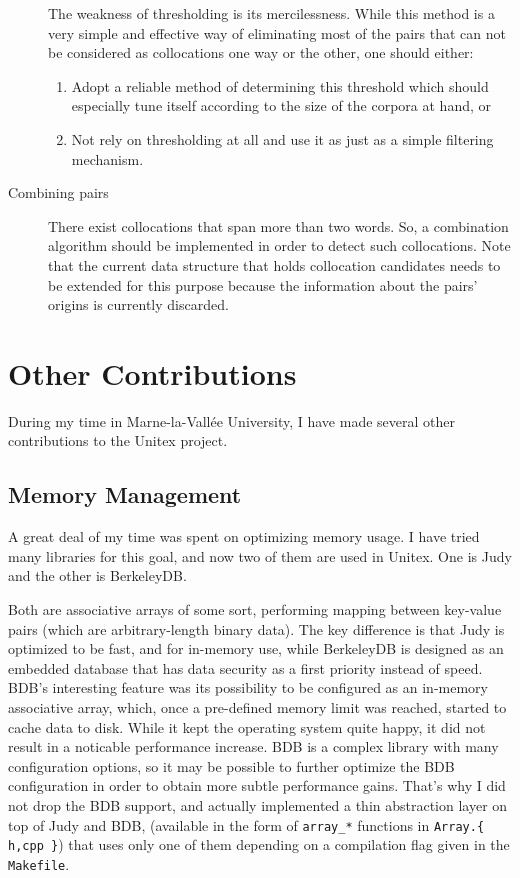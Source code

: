\documentclass[a4paper,12pt,oneside]{article}
\begin{document}
\begin{description}
	The weakness of thresholding is its mercilessness. While this method is a very simple and effective way of eliminating most of the pairs that can not be considered as collocations one way or the other, one should either:
	\begin{enumerate}
		\item Adopt a reliable method of determining this threshold which should especially tune itself according to the size of the corpora at hand, or

		\item Not rely on thresholding at all and use it as just as a simple filtering mechanism.
	\end{enumerate}

	\item[Combining pairs] There exist collocations that span more than two words. So, a combination algorithm should be implemented in order to detect such collocations. Note that the current data structure that holds collocation candidates needs to be extended for this purpose because the information about the pairs' origins is currently discarded.

\end{description}

\section{Other Contributions}
During my time in Marne-la-Vallée University, I have made several other contributions to the Unitex project.

\subsection{Memory Management}
A great deal of my time was spent on optimizing memory usage. I have tried many libraries for this goal, and now two of them are used in Unitex. One is Judy and the other is BerkeleyDB.

Both are associative arrays of some sort, performing mapping between key-value pairs (which are arbitrary-length binary data). The key difference is that Judy is optimized to be fast, and for in-memory use, while BerkeleyDB is designed as an embedded database that has data security as a first priority instead of speed. BDB's interesting feature was its possibility to be configured as an in-memory associative array, which, once a pre-defined memory limit was reached, started to cache data to disk. While it kept the operating system quite happy, it did not result in a noticable performance increase. BDB is a complex library with many configuration options, so it may be possible to further optimize the BDB configuration in order to obtain more subtle performance gains. That's why I did not drop the BDB support, and actually implemented a thin abstraction layer on top of Judy and BDB, (available in the form of \texttt{array\_*} functions in \texttt{Array.\{ h,cpp \}}) that uses only one of them depending on a compilation flag given in the \texttt{Makefile}.
\end{document}
